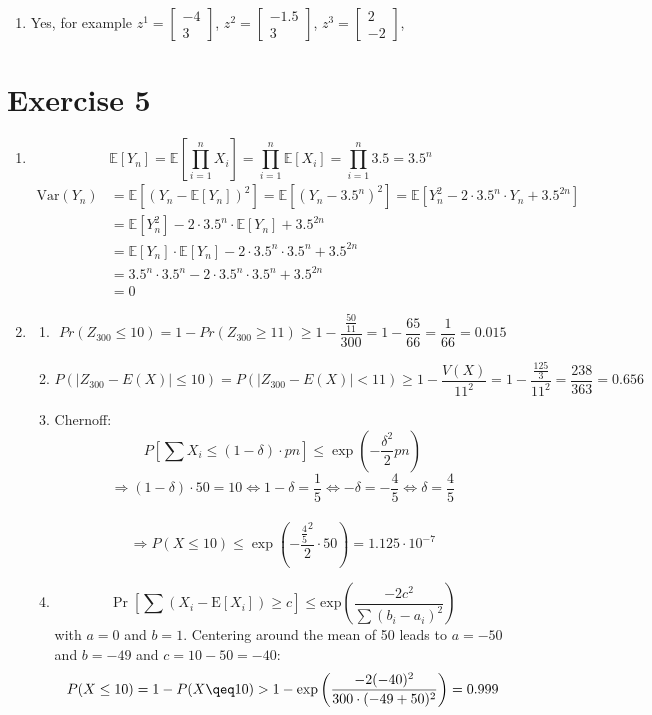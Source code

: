 \documentclass[12pt]{article}
\begin{document}
\begin{enumerate}[label=(\alph*)]
	\item	Yes, for example
			$z^1=\begin{bmatrix} -4 \\ 3 \end{bmatrix}$,
			$z^2=\begin{bmatrix} -1.5 \\ 3 \end{bmatrix}$,
			$z^3=\begin{bmatrix} 2 \\ -2 \end{bmatrix}$,
\end{enumerate}

\section*{Exercise 5}
\begin{enumerate}[label=(\alph*)]
	\item	\[\mathbb{E}[Y_n] = \mathbb{E}[\prod_{i=1}^n X_i] = \prod_{i=1}^n \mathbb{E}[X_i] = \prod_{i=1}^n 3.5 = 3.5^n\]
			\begin{align*}
				\text{Var}(Y_n) &= \mathbb{E}[(Y_n - \mathbb{E}[Y_n])^2] = \mathbb{E}[(Y_n - 3.5^n)^2] = \mathbb{E}[Y_n^2 - 2 \cdot 3.5^n \cdot Y_n + 3.5^{2n}] \\
				&= \mathbb{E}[Y_n^2] - 2 \cdot 3.5^n \cdot \mathbb{E}[Y_n] + 3.5^{2n} \\
				&= \mathbb{E}[Y_n] \cdot \mathbb{E}[Y_n] - 2 \cdot 3.5^n \cdot 3.5^n + 3.5^{2n} \\
				&= 3.5^n \cdot 3.5^n - 2 \cdot 3.5^n \cdot 3.5^n + 3.5^{2n} \\
				&= 0
			\end{align*}
	\item	\begin{enumerate}[label=(\roman*)]
				\item	\[Pr(Z_{300} \leq 10) = 1 - Pr(Z_{300} \geq 11) \geq 1 - \frac{\frac{50}{11}}{300} = 1-  \frac{65}{66} = \frac{1}{66} = 0.015\]
				\item	\[ P(|Z_{300} - E(X)| \leq 10) = P(|Z_{300} - E(X)| < 11) \geq 1 - \frac{V(X)}{11^2} = 1 - \frac{\frac{125}{3}}{11^2} = \frac{238}{363} = 0.656\]
				\item Chernoff: \[ P\left[\sum X_{i}\leq (1-\delta )\cdot pn\right]\leq \exp \left(-{\frac {\delta ^{2}}{2}}pn\right)\]
				\[\Rightarrow (1-\delta)\cdot 50 = 10 \Leftrightarrow
				1 - \delta = \frac{1}{5} \Leftrightarrow
				- \delta = -\frac{4}{5} \Leftrightarrow
				\delta = \frac{4}{5}\] \\
				\[ \Rightarrow P(X \leq 10) \leq \exp(-\frac{\frac{4}{5}^2}{2}\cdot 50) = 1.125 \cdot 10^{-7}\]
				\item \[ \Pr \left[\sum (X_{i}-{\textrm {E}}[X_{i}])\geq c\right]\leq {\textrm {exp}}\left({\frac {-2c^{2}}{\sum (b_{i}-a_{i})^{2}}}\right)\] with $a = 0 $ and $b = 1$. Centering around the mean of 50 leads to $a = -50$ and $b = -49$ and $c = 10 - 50 = -40$:\\
				\[ P(X\leq 10) = 1 - P(X\qeq 10) > 1 - \exp\left({\frac {-2(-40)^{2}}{300 \cdot (-49 + 50)^{2}}}\right) = 0.999 \]
			\end{enumerate}
			
\end{enumerate}
\end{document}
